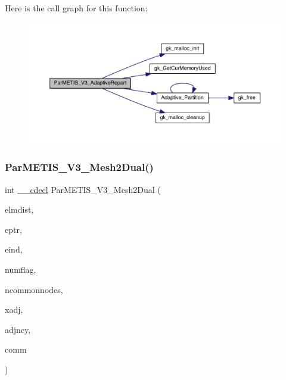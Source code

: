 Here is the call graph for this function\+:\nopagebreak
\begin{figure}[H]
\begin{center}
\leavevmode
\includegraphics[width=350pt]{a00843_ac00c3da2cf618cbfa9158463a851491e_cgraph}
\end{center}
\end{figure}
\mbox{\label{a00843_a2f9e316d7e0c46037cf231cd82cf9d97}} 
\subsubsection{\texorpdfstring{Par\+M\+E\+T\+I\+S\+\_\+\+V3\+\_\+\+Mesh2\+Dual()}{ParMETIS\_V3\_Mesh2Dual()}}
{\footnotesize\ttfamily int \hyperlink{a00843_a238347d7669f8f1e9c83bfe63a2730c4}{\+\_\+\+\_\+cdecl} Par\+M\+E\+T\+I\+S\+\_\+\+V3\+\_\+\+Mesh2\+Dual (\begin{DoxyParamCaption}\item[{\hyperlink{a00876_aaa5262be3e700770163401acb0150f52}{idx\+\_\+t} $\ast$}]{elmdist,  }\item[{\hyperlink{a00876_aaa5262be3e700770163401acb0150f52}{idx\+\_\+t} $\ast$}]{eptr,  }\item[{\hyperlink{a00876_aaa5262be3e700770163401acb0150f52}{idx\+\_\+t} $\ast$}]{eind,  }\item[{\hyperlink{a00876_aaa5262be3e700770163401acb0150f52}{idx\+\_\+t} $\ast$}]{numflag,  }\item[{\hyperlink{a00876_aaa5262be3e700770163401acb0150f52}{idx\+\_\+t} $\ast$}]{ncommonnodes,  }\item[{\hyperlink{a00876_aaa5262be3e700770163401acb0150f52}{idx\+\_\+t} $\ast$$\ast$}]{xadj,  }\item[{\hyperlink{a00876_aaa5262be3e700770163401acb0150f52}{idx\+\_\+t} $\ast$$\ast$}]{adjncy,  }\item[{M\+P\+I\+\_\+\+Comm $\ast$}]{comm }\end{DoxyParamCaption})}

